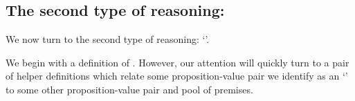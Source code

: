 \begin{note}
\end{note}


\subsection{The second type of reasoning: \adB{}}

\begin{note}
  We now turn to the second type of reasoning: `\adB{}'.

  We begin with a definition of \adB{}.
  However, our attention will quickly turn to a pair of helper definitions which relate some proposition-value pair we identify as an `\itp{}' to some other proposition-value pair and pool of premises.
\end{note}

